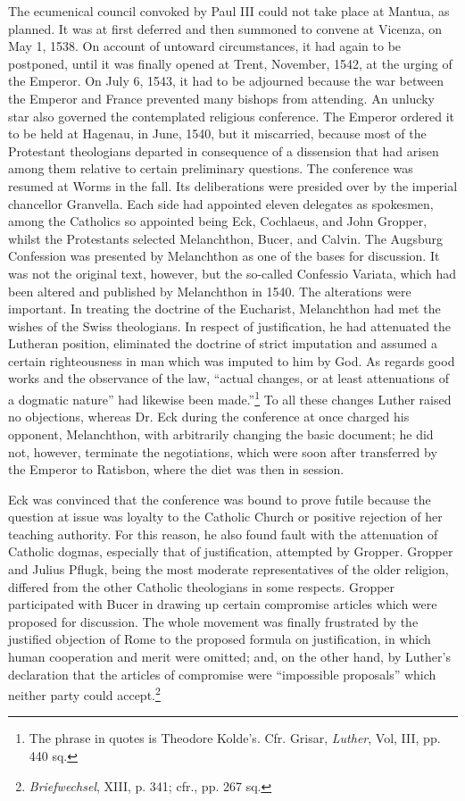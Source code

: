 The ecumenical council convoked by Paul III could not take place
at Mantua, as planned. It was at first deferred and then summoned
to convene at Vicenza, on May 1, 1538. On account of untoward
circumstances, it had again to be postponed, until it was finally opened
at Trent, November, 1542, at the urging of the Emperor. On July 6,
1543, it had to be adjourned because the war between the Emperor
and France prevented many bishops from attending.
An unlucky star also governed the contemplated religious conference. The
Emperor ordered it to be held at Hagenau, in June,
1540, but it miscarried, because most of the Protestant theologians
departed in consequence of a dissension that had arisen among them
relative to certain preliminary questions. The conference was resumed
at Worms in the fall. Its deliberations were presided over by the imperial
chancellor Granvella. Each side had appointed eleven delegates
as spokesmen, among the Catholics so appointed being Eck, Cochlaeus,
and John Gropper, whilst the Protestants selected Melanchthon,
Bucer, and Calvin. The Augsburg Confession was presented by Melanchthon
as one of the bases for discussion. It was not the original
text, however, but the so-called Confessio Variata, which had been
altered and published by Melanchthon in 1540. The alterations were
important. In treating the doctrine of the Eucharist, Melanchthon
had met the wishes of the Swiss theologians. In respect of justification,
he had attenuated the Lutheran position, eliminated the doctrine of
strict imputation and assumed a certain righteousness in man which
was imputed to him by God. As regards good works and the observance of
the law, “actual changes, or at least attenuations of a
dogmatic nature” had likewise been made.”\footnote{The phrase in quotes is Theodore Kolde’s. Cfr. Grisar, \textit{Luther}, Vol, III, pp. 440 sq.}
 To all these changes
Luther raised no objections, whereas Dr. Eck during the conference
at once charged his opponent, Melanchthon, with arbitrarily changing the
basic document; he did not, however, terminate the negotiations,
which were soon after transferred by the Emperor to Ratisbon,
where the diet was then in session.

Eck was convinced that the conference was bound to prove futile
because the question at issue was loyalty to the Catholic Church or
positive rejection of her teaching authority. For this reason, he also
found fault with the attenuation of Catholic dogmas, especially that
of justification, attempted by Gropper. Gropper and Julius Pflugk,
being the most moderate representatives of the older religion, differed
from the other Catholic theologians in some respects. Gropper participated
with Bucer in drawing up certain compromise articles which
were proposed for discussion. The whole movement was finally frustrated
by the justified objection of Rome to the proposed formula on
justification, in which human cooperation and merit were omitted;
and, on the other hand, by Luther’s declaration that the articles of
compromise were “impossible proposals” which neither party could
accept.\footnote{\textit{Briefwechsel}, XIII, p. 341; cfr., pp. 267 sq.}

